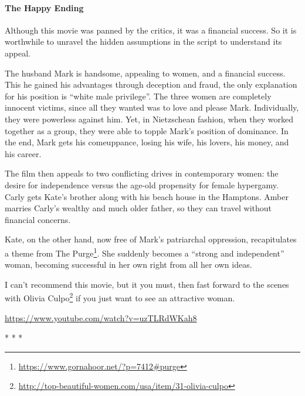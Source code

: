 \paragraph{The Happy Ending}


Although this movie was panned by the critics, it was a financial success. So it is worthwhile to unravel the hidden assumptions in the script to understand its appeal.

The husband Mark is handsome, appealing to women, and a financial success. This he gained his advantages through deception and fraud, the only explanation for his position is ``white male privilege''. The three women are completely innocent victims, since all they wanted was to love and please Mark. Individually, they were powerless against him. Yet, in Nietzschean fashion, when they worked together as a group, they were able to topple Mark's position of dominance. In the end, Mark gets his comeuppance, losing his wife, his lovers, his money, and his career.

The film then appeals to two conflicting drives in contemporary women: the desire for independence versus the age-old propensity for female hypergamy. Carly gets Kate's brother along with his beach house in the Hamptons. Amber marries Carly's wealthy and much older father, so they can travel without financial concerns.

Kate, on the other hand, now free of Mark's patriarchal oppression, recapitulates a theme from The Purge\footnote{\url{https://www.gornahoor.net/?p=7412\#purge}}. She suddenly becomes a ``strong and independent'' woman, becoming successful in her own right from all her own ideas.

I can't recommend this movie, but it you must, then fast forward to the scenes with Olivia Culpo\footnote{\url{http://top-beautiful-women.com/usa/item/31-olivia-culpo}} if you just want to see an attractive woman.

\url{https://www.youtube.com/watch?v=uzTLRdWKah8} 


\begin{center}* * *\end{center}

